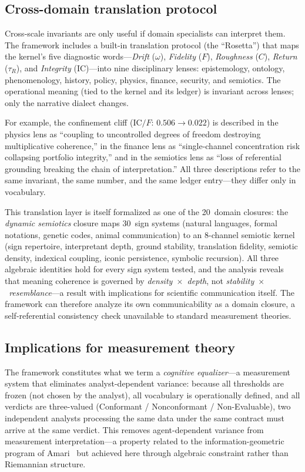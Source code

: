 \documentclass[11pt]{article}
\newcommand{\tR}{\tau_{\!R}}
\newcommand{\IC}{\mathrm{IC}}
\begin{document}
\subsection{Cross-domain translation protocol}

Cross-scale invariants are only useful if domain specialists
can interpret them. The framework includes a built-in translation
protocol (the ``Rosetta'') that maps the kernel's five diagnostic
words---\emph{Drift} ($\omega$), \emph{Fidelity} ($F$),
\emph{Roughness} ($C$), \emph{Return} ($\tR$), and
\emph{Integrity} ($\IC$)---into nine disciplinary lenses:
epistemology, ontology, phenomenology, history, policy, physics,
finance, security, and semiotics. The operational meaning (tied
to the kernel and its ledger) is invariant across lenses; only
the narrative dialect changes.

For example, the confinement cliff ($\IC/F$: $0.506 \to 0.022$)
is described in the physics lens as ``coupling to uncontrolled
degrees of freedom destroying multiplicative coherence,'' in the
finance lens as ``single-channel concentration risk collapsing
portfolio integrity,'' and in the semiotics lens as ``loss of
referential grounding breaking the chain of interpretation.''
All three descriptions refer to the same invariant, the same
number, and the same ledger entry---they differ only in vocabulary.

This translation layer is itself formalized as one of the
20~domain closures: the \emph{dynamic semiotics} closure maps
30~sign systems (natural languages, formal notations, genetic
codes, animal communication) to an 8-channel semiotic kernel
(sign repertoire, interpretant depth, ground stability,
translation fidelity, semiotic density, indexical coupling,
iconic persistence, symbolic recursion). All three algebraic
identities hold for every sign system tested, and the analysis
reveals that meaning coherence is governed by
\emph{density~$\times$~depth}, not
\emph{stability~$\times$~resemblance}---a result
with implications for scientific communication itself. The
framework can therefore analyze its own communicability as a
domain closure, a self-referential consistency check unavailable
to standard measurement theories.

\subsection{Implications for measurement theory}

The framework constitutes what we term a \emph{cognitive
equalizer}---a measurement system that eliminates
analyst-dependent variance: because all thresholds are frozen
(not chosen by the analyst), all vocabulary is operationally
defined, and all verdicts are three-valued (Conformant /
Nonconformant / Non-Evaluable), two independent analysts
processing the same data under the same contract must arrive
at the same verdict. This removes agent-dependent variance
from measurement interpretation---a property related to the
information-geometric program of Amari~\cite{amari2016information}
but achieved here through algebraic constraint rather than
Riemannian structure.
\end{document}
